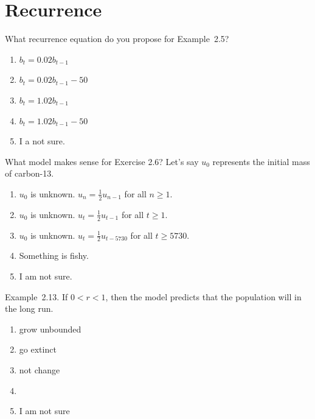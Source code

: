 \documentclass[aspectratio=169, t, 14pt]{beamer}
\begin{document}
\section{Recurrence}

\begin{poll}
  What recurrence equation do you propose for Example~2.5?

  \begin{enumerate}
    \item \(b_{t} = 0.02 b_{t-1}\)
    \item \(b_{t} = 0.02 b_{t-1} - 50\)
    \item \(b_{t} = 1.02 b_{t-1}\)
    \item \(b_{t} = 1.02 b_{t-1} - 50\)
    \item I a not sure.
  \end{enumerate}
\end{poll}

\begin{poll}
  What model makes sense for Exercise 2.6?  Let's say \(u_{0}\) represents the initial mass of carbon-13.

  \begin{enumerate}
    \item \(u_{0}\) is unknown. \(u_{n} = \frac{1}{2} u_{n-1}\) for all \(n \ge 1\).
    \item \(u_{0}\) is unknown. \(u_{t} = \frac{1}{2} u_{t-1}\) for all \(t \ge 1\).
    \item \(u_{0}\) is unknown. \(u_{t} = \frac{1}{2} u_{t-5730}\) for all \(t \ge 5730\).
    \item Something is fishy.
    \item I am not sure.
  \end{enumerate}
\end{poll}

\begin{poll}
  Example~2.13. If \(0 < r < 1\), then the model predicts that the population will \underline{\hspace{1cm}} in the long run.

  \begin{enumerate}
    \item grow unbounded
    \item go extinct
    \item not change
    \item 
    \item I am not sure
  \end{enumerate}
\end{poll}
\end{document}
